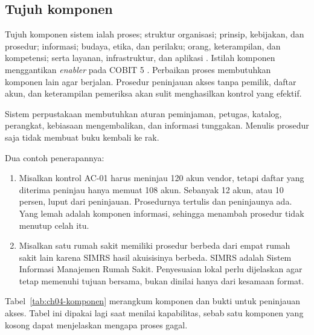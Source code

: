 \subsection*{Tujuh komponen}

Tujuh komponen sistem ialah proses; struktur organisasi; prinsip, kebijakan, dan prosedur; informasi;
budaya, etika, dan perilaku; orang, keterampilan, dan kompetensi; serta layanan, infrastruktur, dan
aplikasi \cite{c04-sistematis}. Istilah komponen menggantikan \textit{enabler} pada COBIT 5
\cite{c04-baru}. Perbaikan proses membutuhkan komponen lain agar berjalan. Prosedur peninjauan akses
tanpa pemilik, daftar akun, dan keterampilan pemeriksa akan sulit menghasilkan kontrol yang efektif.

Sistem perpustakaan membutuhkan aturan peminjaman, petugas, katalog, perangkat, kebiasaan
mengembalikan, dan informasi tunggakan. Menulis prosedur saja tidak membuat buku kembali ke rak.

Dua contoh penerapannya:
\begin{enumerate}
  \item Misalkan kontrol AC-01 harus meninjau 120 akun vendor, tetapi daftar yang diterima peninjau
  hanya memuat 108 akun. Sebanyak 12 akun, atau 10 persen, luput dari peninjauan. Prosedurnya tertulis
  dan peninjaunya ada. Yang lemah adalah komponen informasi, sehingga menambah prosedur tidak menutup
  celah itu.
  \item Misalkan satu rumah sakit memiliki prosedur berbeda dari empat rumah sakit lain karena SIMRS
  hasil akuisisinya berbeda. SIMRS adalah Sistem Informasi Manajemen Rumah Sakit. Penyesuaian lokal perlu
  dijelaskan agar tetap memenuhi tujuan bersama, bukan dinilai hanya dari kesamaan format.
\end{enumerate}

Tabel~\ref{tab:ch04-komponen} merangkum komponen dan bukti untuk peninjauan akses. Tabel ini dipakai
lagi saat menilai kapabilitas, sebab satu komponen yang kosong dapat menjelaskan mengapa proses gagal.

